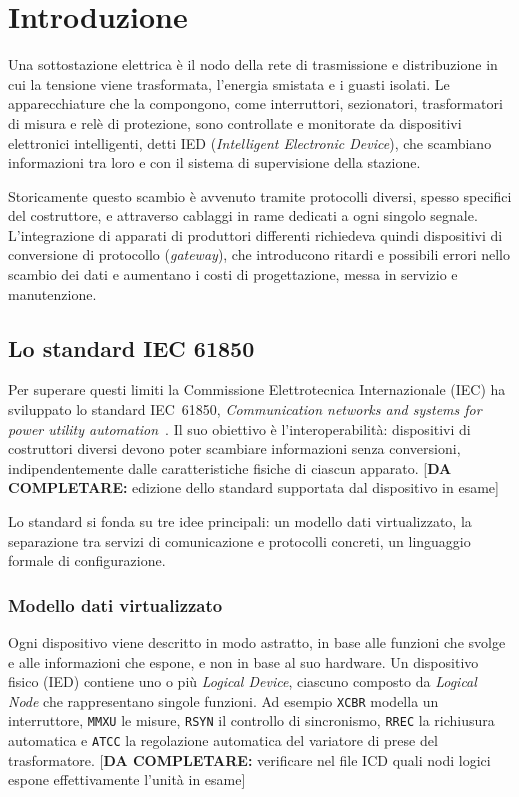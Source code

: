\documentclass[11pt,a4paper,italian,oneside,openany]{book}
\newcommand{\daf}[1]{{\color{red}[\textbf{DA COMPLETARE:} #1]}}
\begin{document}
\frontmatter
\tableofcontents
\mainmatter

\chapter{Introduzione}\label{cap:introduzione}
Una sottostazione elettrica è il nodo della rete di trasmissione e distribuzione in cui la tensione viene trasformata, l'energia smistata e i guasti isolati. Le apparecchiature che la compongono, come interruttori, sezionatori, trasformatori di misura e relè di protezione, sono controllate e monitorate da dispositivi elettronici intelligenti, detti IED (\textit{Intelligent Electronic Device}), che scambiano informazioni tra loro e con il sistema di supervisione della stazione.

Storicamente questo scambio è avvenuto tramite protocolli diversi, spesso specifici del costruttore, e attraverso cablaggi in rame dedicati a ogni singolo segnale. L'integrazione di apparati di produttori differenti richiedeva quindi dispositivi di conversione di protocollo (\textit{gateway}), che introducono ritardi e possibili errori nello scambio dei dati e aumentano i costi di progettazione, messa in servizio e manutenzione.

\section{Lo standard IEC 61850}\label{sec:standard}
Per superare questi limiti la Commissione Elettrotecnica Internazionale (IEC) ha sviluppato lo standard IEC~61850, \textit{Communication networks and systems for power utility automation}~\cite{iec61850}. Il suo obiettivo è l'interoperabilità: dispositivi di costruttori diversi devono poter scambiare informazioni senza conversioni, indipendentemente dalle caratteristiche fisiche di ciascun apparato. \daf{edizione dello standard supportata dal dispositivo in esame}

Lo standard si fonda su tre idee principali: un modello dati virtualizzato, la separazione tra servizi di comunicazione e protocolli concreti, un linguaggio formale di configurazione.

\subsection{Modello dati virtualizzato}
Ogni dispositivo viene descritto in modo astratto, in base alle funzioni che svolge e alle informazioni che espone, e non in base al suo hardware. Un dispositivo fisico (IED) contiene uno o più \textit{Logical Device}, ciascuno composto da \textit{Logical Node} che rappresentano singole funzioni. Ad esempio \texttt{XCBR} modella un interruttore, \texttt{MMXU} le misure, \texttt{RSYN} il controllo di sincronismo, \texttt{RREC} la richiusura automatica e \texttt{ATCC} la regolazione automatica del variatore di prese del trasformatore. \daf{verificare nel file ICD quali nodi logici espone effettivamente l'unità in esame}
\end{document}
